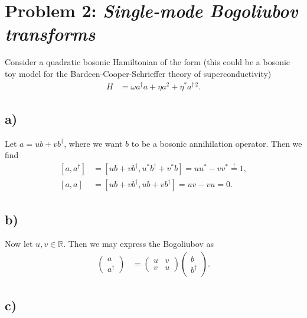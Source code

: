 \documentclass[english, parskip=full]{scrartcl}
\newcommand{\klam}{}
\begin{document}
\newpage
\section*{Problem 2: \normalfont\textit{\large{Single-mode Bogoliubov transforms}}}
Consider a quadratic bosonic Hamiltonian of the form (this could be a bosonic toy model for the Bardeen-Cooper-Schrieffer theory of superconductivity)
\begin{align}
H &= \omega a^\dagger a + \eta a^2 + \eta^\ast a^{\dagger\,2}.
\end{align}
\subsection*{a)}
Let $a = ub + vb^\dagger$, where we want $b$ to be a bosonic annihilation operator.
Then we find
\begin{align}
\klam\left[ a,a^\dagger  \right] &= \klam\left[ ub + vb^\dagger, u^\ast b^\dagger + v^\ast b \right] = uu^\ast - vv^\ast \overset{!}{=} 1,\\
\klam\left[ a,a \right] &= \klam\left[ ub + vb^\dagger, ub + vb^\dagger \right] = uv - vu = 0.
\end{align}

\subsection*{b)}
Now let $u,v\in\mathbb{R}$.
Then we may express the Bogoliubov as 
\begin{align}
\begin{pmatrix}
a \\ a^\dagger
\end{pmatrix} &= \begin{pmatrix}
u & v \\ v & u
\end{pmatrix}\begin{pmatrix}
b \\ b^\dagger
\end{pmatrix}.
\end{align}

\subsection*{c)}
\end{document}
